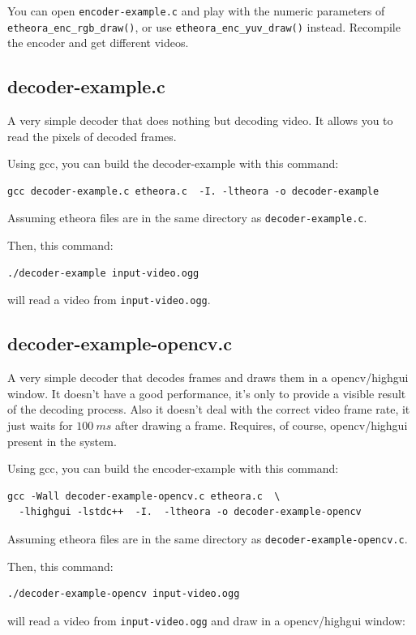\documentclass{article}
\begin{document}
You can open \texttt{encoder-example.c} and play with the numeric
parameters of \texttt{etheora\_enc\_rgb\_draw()}, or use 
\texttt{etheora\_enc\_yuv\_draw()} instead. Recompile the encoder and 
get different videos. 

\subsection{decoder-example.c}

A very simple decoder that does nothing but decoding video. It allows
you to read the pixels of decoded frames. 

Using gcc, you can build the decoder-example with this command: 
\begin{verbatim}
gcc decoder-example.c etheora.c  -I. -ltheora -o decoder-example
\end{verbatim}
Assuming etheora files are in the same directory as 
\texttt{decoder-example.c}. 

Then, this command:
\begin{verbatim}
./decoder-example input-video.ogg  
\end{verbatim}
will read a video from \texttt{input-video.ogg}. 

\subsection{decoder-example-opencv.c}

A very simple decoder that decodes frames and draws them in a
opencv/highgui window. It doesn't have a good performance, it's
only to provide a visible result of the decoding process. Also it
doesn't deal with the correct video frame rate, it just waits
for $100 ~ms$ after drawing a frame.  
Requires, of course, opencv/highgui present in the system. 

Using gcc, you can build the encoder-example with this command: 
\begin{verbatim}
gcc -Wall decoder-example-opencv.c etheora.c  \
  -lhighgui -lstdc++  -I.  -ltheora -o decoder-example-opencv
\end{verbatim}
Assuming etheora files are in the same directory as 
\texttt{decoder-example-opencv.c}. 

Then, this command:
\begin{verbatim}
./decoder-example-opencv input-video.ogg  
\end{verbatim}
will read a video from \texttt{input-video.ogg} and draw in a
opencv/highgui window: 
\end{document}

